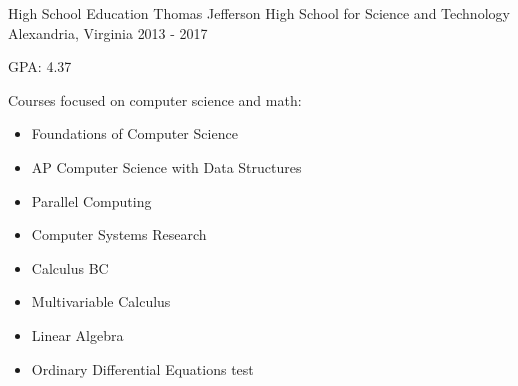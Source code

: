 \begin{cventries}
  \cventry
    {High School Education}
    {Thomas Jefferson High School for Science and Technology}
    {Alexandria, Virginia}
    {2013 - 2017}
    {
      \begin{cvitems}
        \item {GPA: 4.37}
        \item {Courses focused on computer science and math:}
        \vspace{-1em}
        \begin{multicols}{2}
        \begin{itemize}
            \item Foundations of Computer Science
            \item AP Computer Science with Data Structures
            \item Parallel Computing
            \item Computer Systems Research
        \end{itemize}
        \begin{itemize}
            \item Calculus BC
            \item Multivariable Calculus
            \item Linear Algebra
            \item Ordinary Differential Equations test
        \end{itemize}
        \end{multicols}
        \vspace{-1em}
      \end{cvitems}
    }
\end{cventries}

